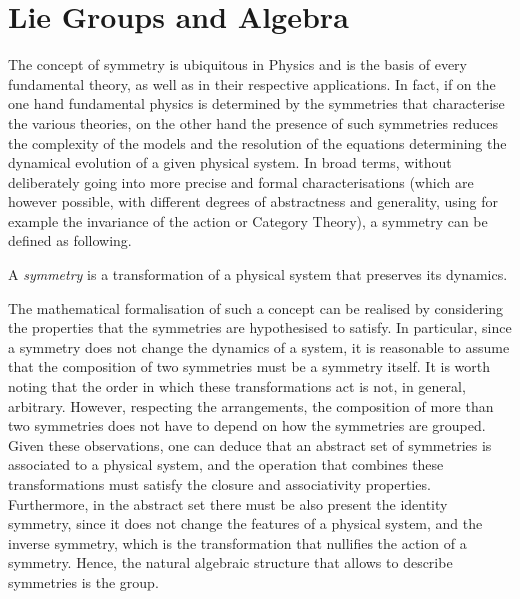 \section{Lie Groups and Algebra}\label{sec:lie-groups-algebras}

The concept of symmetry is ubiquitous in Physics and is the basis of every fundamental theory, as well as in their respective applications. In fact, if on the one hand fundamental physics is determined by the symmetries that characterise the various theories, on the other hand the presence of such symmetries reduces the complexity of the models and the resolution of the equations determining the dynamical evolution of a given physical system. In broad terms, without deliberately going into more precise and formal characterisations (which are however possible, with different degrees of abstractness and generality, using for example the invariance of the action or Category Theory), a symmetry can be defined as following.

\begin{definition}[Symmetry]
    A \emph{symmetry} is a transformation of a physical system that preserves its dynamics.
\end{definition}

The mathematical formalisation of such a concept can be realised by considering the properties that the symmetries are hypothesised to satisfy. In particular, since a symmetry does not change the dynamics of a system, it is reasonable to assume that the composition of two symmetries must be a symmetry itself. It is worth noting that the order in which these transformations act is not, in general, arbitrary. However, respecting the arrangements, the composition of more than two symmetries does not have to depend on how the symmetries are grouped. Given these observations, one can deduce that an abstract set of symmetries is associated to a physical system, and the operation that combines these transformations must satisfy the closure and associativity properties. Furthermore, in the abstract set there must be also present the identity symmetry, since it does not change the features of a physical system, and the inverse symmetry, which is the transformation that nullifies the action of a symmetry. Hence, the natural algebraic structure that allows to describe symmetries is the group. 


